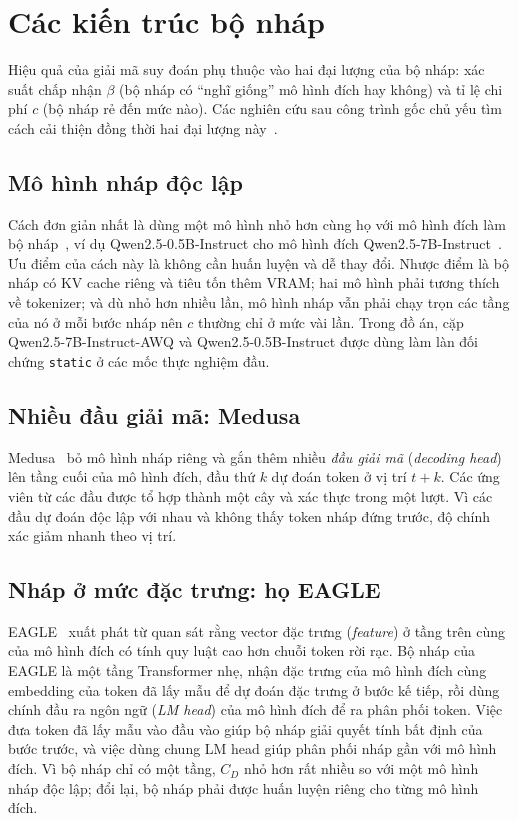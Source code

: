 \section{Các kiến trúc bộ nháp}
\label{sec:kien-truc-nhap}

Hiệu quả của giải mã suy đoán phụ thuộc vào hai đại lượng của bộ nháp: xác suất chấp nhận $\beta$ (bộ nháp có ``nghĩ giống'' mô hình đích hay không) và tỉ lệ chi phí $c$ (bộ nháp rẻ đến mức nào). Các nghiên cứu sau công trình gốc chủ yếu tìm cách cải thiện đồng thời hai đại lượng này~\cite{xia2024survey}.

\subsection{Mô hình nháp độc lập}

Cách đơn giản nhất là dùng một mô hình nhỏ hơn cùng họ với mô hình đích làm bộ nháp~\cite{leviathan2023speculative,chen2023speculative}, ví dụ Qwen2.5-0.5B-Instruct cho mô hình đích Qwen2.5-7B-Instruct~\cite{qwen2024qwen25}. Ưu điểm của cách này là không cần huấn luyện và dễ thay đổi. Nhược điểm là bộ nháp có KV cache riêng và tiêu tốn thêm VRAM; hai mô hình phải tương thích về tokenizer; và dù nhỏ hơn nhiều lần, mô hình nháp vẫn phải chạy trọn các tầng của nó ở mỗi bước nháp nên $c$ thường chỉ ở mức vài lần. Trong đồ án, cặp Qwen2.5-7B-Instruct-AWQ và Qwen2.5-0.5B-Instruct được dùng làm làn đối chứng \texttt{static} ở các mốc thực nghiệm đầu.

\subsection{Nhiều đầu giải mã: Medusa}

Medusa~\cite{cai2024medusa} bỏ mô hình nháp riêng và gắn thêm nhiều \textit{đầu giải mã} (\textit{decoding head}) lên tầng cuối của mô hình đích, đầu thứ $k$ dự đoán token ở vị trí $t+k$. Các ứng viên từ các đầu được tổ hợp thành một cây và xác thực trong một lượt. Vì các đầu dự đoán độc lập với nhau và không thấy token nháp đứng trước, độ chính xác giảm nhanh theo vị trí.

\subsection{Nháp ở mức đặc trưng: họ EAGLE}

EAGLE~\cite{li2024eagle} xuất phát từ quan sát rằng vector đặc trưng (\textit{feature}) ở tầng trên cùng của mô hình đích có tính quy luật cao hơn chuỗi token rời rạc. Bộ nháp của EAGLE là một tầng Transformer nhẹ, nhận đặc trưng của mô hình đích cùng embedding của token đã lấy mẫu để dự đoán đặc trưng ở bước kế tiếp, rồi dùng chính đầu ra ngôn ngữ (\textit{LM head}) của mô hình đích để ra phân phối token. Việc đưa token đã lấy mẫu vào đầu vào giúp bộ nháp giải quyết tính bất định của bước trước, và việc dùng chung LM head giúp phân phối nháp gần với mô hình đích. Vì bộ nháp chỉ có một tầng, $C_D$ nhỏ hơn rất nhiều so với một mô hình nháp độc lập; đổi lại, bộ nháp phải được huấn luyện riêng cho từng mô hình đích.

